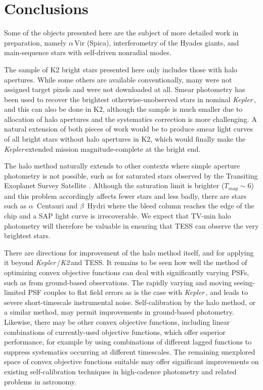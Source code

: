 \documentclass[modern]{aastex62}
\newcommand\kepler{\emph{Kepler}\,}
\newcommand\ktwo{\emph{K2}\,}
\begin{document}
\section{Conclusions}
\label{sec:conclusions}


Some of the objects presented here are the subject of more detailed work in preparation, namely $\alpha$\,Vir (Spica), interferometry of the Hyades giants, and main-sequence stars with self-driven nonradial modes.

The sample of K2 bright stars presented here only includes those with halo apertures. While some others are available conventionally, many were not assigned target pixels and were not downloaded at all. Smear photometry has been used to recover the brightest otherwise-unobserved stars in nominal \kepler \citep{smearcampaign}, and this can also be done in K2, although the sample is much smaller due to allocation of halo apertures and the systematics correction is more challenging. A natural extension of both pieces of work would be to produce smear light curves of all bright stars without halo apertures in K2, which would finally make the \kepler extended mission magnitude-complete at the bright end. 

The halo method naturally extends to other contexts where simple aperture photometry is not possible, such as for saturated stars observed by the Transiting Exoplanet Survey Satellite \citep[TESS;][]{tess}. Although the saturation limit is brighter ($T_{mag} \sim 6$) and this problem accordingly affects fewer stars and less badly, there are stars such as $\alpha$~Centauri and $\beta$~Hydri where the bleed column reaches the edge of the chip and a SAP light curve is irrecoverable. We expect that TV-min halo photometry will therefore be valuable in ensuring that TESS can observe the very brightest stars.

There are directions for improvement of the halo method itself, and for applying it beyond \kepler/\ktwo and TESS. It remains to be seen how well the method of optimizing convex objective functions can deal with significantly varying PSFs, such as from ground-based observations. The rapidly varying and moving seeing-limited PSF couples to flat field errors as is the case with \kepler, and leads to severe short-timescale instrumental noise. Self-calibration by the halo method, or a similar method, may permit improvements in ground-based photometry. Likewise, there may be other convex objective functions, including linear combinations of currently-used objective functions, which offer superior performance, for example by using combinations of different lagged functions to suppress systematics occurring at different timescales. The remaining unexplored space of convex objective functions suitable may offer significant improvements on existing self-calibration techniques in high-cadence photometry and related problems in astronomy.
\end{document}
